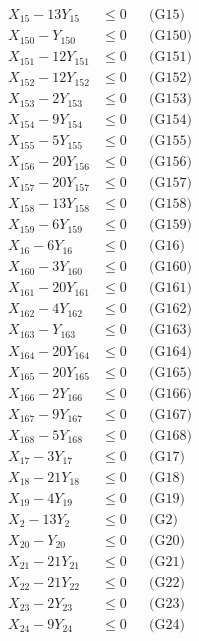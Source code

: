 \documentclass[a4paper,10pt]{article}
\begin{document}
{\begin{align}
X_{15} - 13Y_{15} &\leq 0 && \text{(G15)} \\
X_{150} - Y_{150} &\leq 0 && \text{(G150)} \\
X_{151} - 12Y_{151} &\leq 0 && \text{(G151)} \\
\allowbreak
X_{152} - 12Y_{152} &\leq 0 && \text{(G152)} \\
X_{153} - 2Y_{153} &\leq 0 && \text{(G153)} \\
X_{154} - 9Y_{154} &\leq 0 && \text{(G154)} \\
X_{155} - 5Y_{155} &\leq 0 && \text{(G155)} \\
X_{156} - 20Y_{156} &\leq 0 && \text{(G156)} \\
X_{157} - 20Y_{157} &\leq 0 && \text{(G157)} \\
X_{158} - 13Y_{158} &\leq 0 && \text{(G158)} \\
X_{159} - 6Y_{159} &\leq 0 && \text{(G159)} \\
X_{16} - 6Y_{16} &\leq 0 && \text{(G16)} \\
X_{160} - 3Y_{160} &\leq 0 && \text{(G160)} \\
X_{161} - 20Y_{161} &\leq 0 && \text{(G161)} \\
X_{162} - 4Y_{162} &\leq 0 && \text{(G162)} \\
X_{163} - Y_{163} &\leq 0 && \text{(G163)} \\
X_{164} - 20Y_{164} &\leq 0 && \text{(G164)} \\
X_{165} - 20Y_{165} &\leq 0 && \text{(G165)} \\
X_{166} - 2Y_{166} &\leq 0 && \text{(G166)} \\
X_{167} - 9Y_{167} &\leq 0 && \text{(G167)} \\
X_{168} - 5Y_{168} &\leq 0 && \text{(G168)} \\
X_{17} - 3Y_{17} &\leq 0 && \text{(G17)} \\
X_{18} - 21Y_{18} &\leq 0 && \text{(G18)} \\
\allowbreak
X_{19} - 4Y_{19} &\leq 0 && \text{(G19)} \\
X_{2} - 13Y_{2} &\leq 0 && \text{(G2)} \\
X_{20} - Y_{20} &\leq 0 && \text{(G20)} \\
X_{21} - 21Y_{21} &\leq 0 && \text{(G21)} \\
X_{22} - 21Y_{22} &\leq 0 && \text{(G22)} \\
X_{23} - 2Y_{23} &\leq 0 && \text{(G23)} \\
X_{24} - 9Y_{24} &\leq 0 && \text{(G24)} \\

\end{align}}
\end{document}
